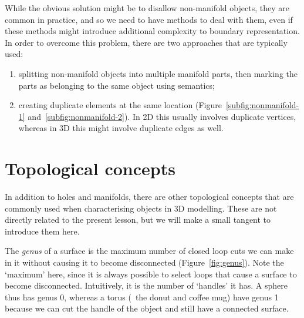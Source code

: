 While the obvious solution might be to disallow non-manifold objects, they are common in practice, and so we need to have methods to deal with them, even if these methods might introduce additional complexity to boundary representation.
In order to overcome this problem, there are two approaches that are typically used:

\begin{enumerate}
	\item splitting non-manifold objects into multiple manifold parts, then marking the parts as belonging to the same object using semantics;
	\item creating duplicate elements at the same location (Figure~\ref{subfig:nonmanifold-1} and~\ref{subfig:nonmanifold-2}).
		In 2D this usually involves duplicate vertices, whereas in 3D this might involve duplicate edges as well.
\end{enumerate}

\section{Topological concepts}

In addition to holes and manifolds, there are other topological concepts that are commonly used when characterising objects in 3D modelling.
These are not directly related to the present lesson, but we will make a small tangent to introduce them here.

The \emph{genus} of a surface is the maximum number of closed loop cuts we can make in it without causing it to become disconnected (Figure~\ref{fig:genus}).
Note the `maximum' here, since it is always possible to select loops that cause a surface to become disconnected.
Intuitively, it is the number of `handles' it has.
A sphere thus has genus 0, whereas a torus (\eg\ the donut and coffee mug) have genus 1 because we can cut the handle of the object and still have a connected surface.

